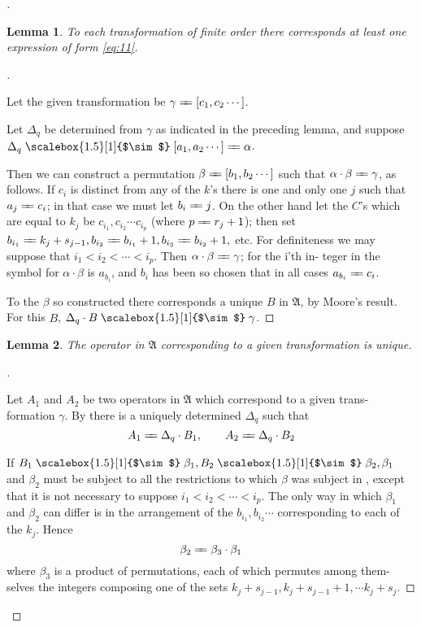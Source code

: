 \documentclass[10pt, twoside]{extarticle}
\def\varequals#1{\mathrel{\leaders\hbox to3pt{$=$\hss}\hskip#1=}}
\newcommand\longeq{\varequals{0.4em}}
\newcommand{\widesim}[2][1.5]{
  \mathrel{\overset{#2}{\scalebox{#1}[1]{$\sim$}}}
}
\newcommand\longsim{\widesim{}}
\theoremstyle{breaktheorem}
\theoremstyle{mylemma}
\newtheorem{lemma}{Lemma}
\theoremstyle{mydefinition}
\theoremstyle{mycorollary}
\newenvironment{proofnewlineindent}[1][\proofname]{%
  \begin{proof}[\indent#1]$ $\par\nobreak\ignorespaces
}{%
  \end{proof}
}
\begin{document}
\begin{proofnewlineindent}
\begin{lemma}
  \label{lemma:4}
  To each transformation of finite order there corresponds at
  least one expression of form \eqref{eq:11}.
\end{lemma}
\begin{proofnewlineindent}
  Let the given transformation be \(\gamma \longeq [c_1, c_2 \cdots]\).

  Let \(\Delta_q\) be determined from \(\gamma\) as indicated in the preceding lemma, and
  suppose \(\Delta_q \longsim [a_1, a_2 \cdots] \longeq \alpha\).

  Then we can construct a permutation \(\beta \longeq [b_1, b_2 \cdots]\) such that
  \(\alpha \cdot \beta \longeq \gamma\), as follows. If \(c_i\) is distinct from any of the \(k\)'s there is one and
  only one \(j\) such that \(a_j \longeq c_i\); in that case we must let \(b_i \longeq j\). On the other
  hand let the \(C\)'s which are equal to \(k_j\) be \(c_{i_1}, c_{i_2} \cdots c_{i_p}\) (where \(p \longeq r_j + 1\));
  then set \(b_{i_1} \longeq k_j + s_{j-1}, b_{i_2} \longeq b_{i_1} +1, b_{i_3} \longeq b_{i_2} +1,\) etc. For definiteness
  we may suppose that \(i_1 < i_2 < \cdots < i_p\). Then \(\alpha \cdot \beta \longeq \gamma\); for the i'th in-
  teger in the symbol for \(\alpha \cdot \beta\) is \(a_{b_i}\), and \(b_i\) has been so chosen that in all
  cases \(a_{b_i} \longeq c_i\).

  To the \(\beta\) so constructed there corresponds a unique \(B\) in \(\mathfrak{A}\), by Moore's
  result. For this \(B\), \(\Delta_q \cdot B \longsim \gamma\).
\end{proofnewlineindent}

\begin{lemma}
  \label{lemma:5}
  The operator in \(\mathfrak{A}\) corresponding to a given transformation
  is unique.
\end{lemma}
\begin{proofnewlineindent}
  Let \(A_1\) and \(A_2\) be two operators in \(\mathfrak{A}\) which correspond to a given trans-
  formation \(\gamma\). By  there is a uniquely determined \(\Delta_q\)
  such that
  \[A_1 \longeq \Delta_q \cdot B_1, \qquad A_2 \longeq \Delta_q \cdot B_2\]

  If \(B_1 \longsim \beta_1, B_2 \longsim \beta_2, \beta_1\) and \(\beta_2\) must be subject to all the restrictions
  to which \(\beta\) was subject in , except that it is not necessary to suppose
  \(i_1 < i_2 < \cdots < i_p\). The only way in which \(\beta_1\) and \(\beta_2\) can differ is in the
  arrangement of the \(b_{i_1}, b_{i_2} \cdots\) corresponding to each of the \(k_j\). Hence
  \[\beta_2 \longeq \beta_3 \cdot \beta_1\]
  where \(\beta_3\) is a product of permutations, each of which permutes among them-
  selves the integers composing one of the sets \(k_j + s_{j-1}, k_j + s_{j-1} + 1, \cdots k_j + s_j\).


\end{proofnewlineindent}
\end{proofnewlineindent}
\end{document}
